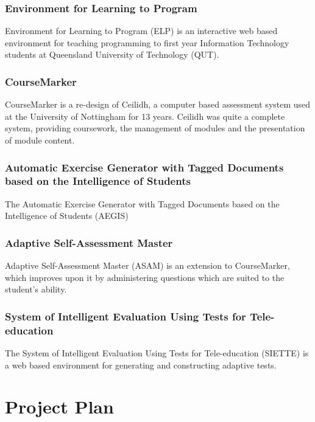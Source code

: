 \documentclass[11pt,a4paper]{report}
\begin{document}
\subsection{Environment for Learning to Program}
Environment for Learning to Program (ELP) is an interactive web based environment for teaching programming to first year Information Technology students at Queensland University of Technology (QUT).

\subsection{CourseMarker}
CourseMarker is a re-design of Ceilidh, a computer based assessment system used at the University of Nottingham for 13 years. Ceilidh was quite a complete system, providing coursework, the management of modules and the presentation of module content.

\subsection{Automatic Exercise Generator with Tagged Documents based on the Intelligence of Students}
The Automatic Exercise Generator with Tagged Documents based on the Intelligence of Students (AEGIS)

\subsection{Adaptive Self-Assessment Master}
Adaptive Self-Assessment Master (ASAM) is an extension to CourseMarker, which improves upon it by administering questions which are suited to the student's ability.

\subsection{System of Intelligent Evaluation Using Tests for Tele-education}
The System of Intelligent Evaluation Using Tests for Tele-education (SIETTE) is a web based environment for generating and constructing adaptive tests.



\chapter{Project Plan}
\end{document}
